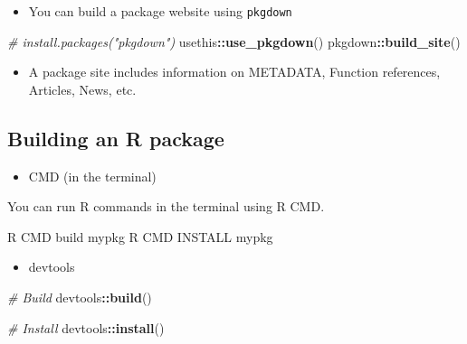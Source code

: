 \documentclass[
]{book}
\newenvironment{Shaded}{\begin{snugshade}}{\end{snugshade}}
\newcommand{\CommentTok}[1]{\textcolor[rgb]{0.56,0.35,0.01}{\textit{#1}}}
\newcommand{\ExtensionTok}[1]{#1}
\newcommand{\FunctionTok}[1]{\textcolor[rgb]{0.13,0.29,0.53}{\textbf{#1}}}
\newcommand{\NormalTok}[1]{#1}
\newcommand{\SpecialCharTok}[1]{\textcolor[rgb]{0.81,0.36,0.00}{\textbf{#1}}}
\providecommand{\tightlist}{%
  \setlength{\itemsep}{0pt}\setlength{\parskip}{0pt}}
\begin{document}
\begin{itemize}
\tightlist
\item
  You can build a package website using \texttt{pkgdown}
\end{itemize}

\begin{Shaded}
\begin{Highlighting}[]
\CommentTok{\# install.packages("pkgdown")}
\NormalTok{usethis}\SpecialCharTok{::}\FunctionTok{use\_pkgdown}\NormalTok{()}
\NormalTok{pkgdown}\SpecialCharTok{::}\FunctionTok{build\_site}\NormalTok{()}
\end{Highlighting}
\end{Shaded}

\begin{itemize}
\tightlist
\item
  A package site includes information on METADATA, Function references, Articles, News, etc.
\end{itemize}

\subsection{Building an R package}\label{building-an-r-package}

\begin{itemize}
\tightlist
\item
  CMD (in the terminal)
\end{itemize}

You can run R commands in the terminal using R CMD.

\begin{Shaded}
\begin{Highlighting}[]
\ExtensionTok{R}\NormalTok{ CMD build mypkg }
\ExtensionTok{R}\NormalTok{ CMD INSTALL mypkg }
\end{Highlighting}
\end{Shaded}

\begin{itemize}
\tightlist
\item
  devtools
\end{itemize}

\begin{Shaded}
\begin{Highlighting}[]
\CommentTok{\# Build }
\NormalTok{devtools}\SpecialCharTok{::}\FunctionTok{build}\NormalTok{()}

\CommentTok{\# Install }
\NormalTok{devtools}\SpecialCharTok{::}\FunctionTok{install}\NormalTok{()}
\end{Highlighting}
\end{Shaded}
\end{document}
